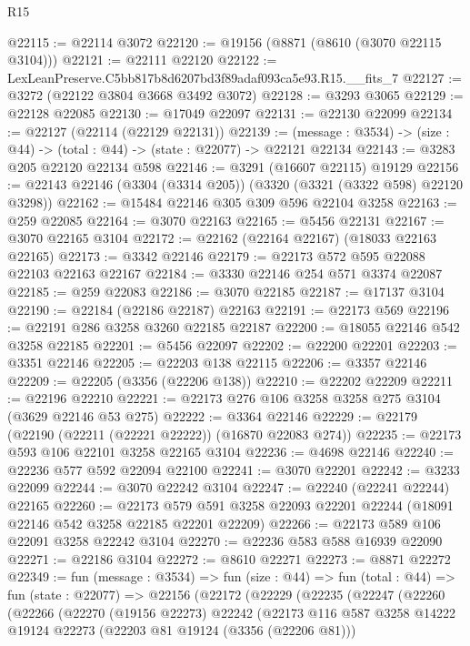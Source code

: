 \begin{lexlean}{R15}
\begin{coremodule}
@22115 := @22114 @3072
@22120 := @19156 (@8871 (@8610 (@3070 @22115 @3104)))
@22121 := @22111 @22120
@22122 := LexLeanPreserve.C5bb817b8d6207bd3f89adaf093ca5e93.R15.__fits_7
@22127 := @3272 (@22122 @3804 @3668 @3492 @3072)
@22128 := @3293 @3065
@22129 := @22128 @22085
@22130 := @17049 @22097
@22131 := @22130 @22099
@22134 := @22127 (@22114 (@22129 @22131))
@22139 := (message : @3534) -> (size : @44) -> (total : @44) -> (state : @22077) -> @22121 @22134
@22143 := @3283 @205 @22120 @22134 @598
@22146 := @3291 (@16607 @22115) @19129
@22156 := @22143 @22146 (@3304 (@3314 @205)) (@3320 (@3321 (@3322 @598) @22120 @3298))
@22162 := @15484 @22146 @305 @309 @596 @22104 @3258
@22163 := @259 @22085
@22164 := @3070 @22163
@22165 := @5456 @22131
@22167 := @3070 @22165 @3104
@22172 := @22162 (@22164 @22167) (@18033 @22163 @22165)
@22173 := @3342 @22146
@22179 := @22173 @572 @595 @22088 @22103 @22163 @22167
@22184 := @3330 @22146 @254 @571 @3374 @22087
@22185 := @259 @22083
@22186 := @3070 @22185
@22187 := @17137 @3104
@22190 := @22184 (@22186 @22187) @22163
@22191 := @22173 @569
@22196 := @22191 @286 @3258 @3260 @22185 @22187
@22200 := @18055 @22146 @542 @3258 @22185
@22201 := @5456 @22097
@22202 := @22200 @22201
@22203 := @3351 @22146
@22205 := @22203 @138 @22115
@22206 := @3357 @22146
@22209 := @22205 (@3356 (@22206 @138))
@22210 := @22202 @22209
@22211 := @22196 @22210
@22221 := @22173 @276 @106 @3258 @3258 @275 @3104 (@3629 @22146 @53 @275)
@22222 := @3364 @22146
@22229 := @22179 (@22190 (@22211 (@22221 @22222)) (@16870 @22083 @274))
@22235 := @22173 @593 @106 @22101 @3258 @22165 @3104
@22236 := @4698 @22146
@22240 := @22236 @577 @592 @22094 @22100
@22241 := @3070 @22201
@22242 := @3233 @22099
@22244 := @3070 @22242 @3104
@22247 := @22240 (@22241 @22244) @22165
@22260 := @22173
    @579
    @591
    @3258
    @22093
    @22201
    @22244
    (@18091 @22146 @542 @3258 @22185 @22201 @22209)
@22266 := @22173 @589 @106 @22091 @3258 @22242 @3104
@22270 := @22236 @583 @588 @16939 @22090
@22271 := @22186 @3104
@22272 := @8610 @22271
@22273 := @8871 @22272
@22349 := fun (message : @3534) =>
  fun (size : @44) =>
  fun (total : @44) =>
  fun (state : @22077) =>
  @22156
    (@22172
      (@22229
        (@22235
          (@22247
            (@22260
              (@22266
                (@22270
                  (@19156 @22273)
                  @22242
                  (@22173
                    @116
                    @587
                    @3258
                    @14222
                    @19124
                    @22273
                    (@22203 @81 @19124 (@3356 (@22206 @81)))

\end{coremodule}
\end{lexlean}
